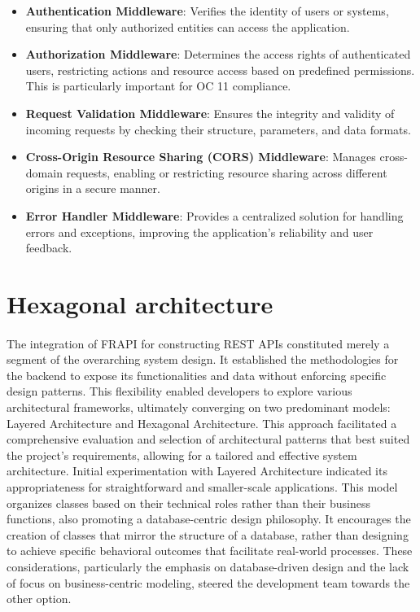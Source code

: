 \begin{itemize}
    \item \textbf{Authentication Middleware}: Verifies the identity of users or systems, ensuring that only authorized entities can access the application.
    \item \textbf{Authorization Middleware}: Determines the access rights of authenticated users, restricting actions and resource access based on predefined permissions. This is particularly important for OC 11 compliance.
    \item \textbf{Request Validation Middleware}: Ensures the integrity and validity of incoming requests by checking their structure, parameters, and data formats.
    \item \textbf{Cross-Origin Resource Sharing (CORS) Middleware}: Manages cross-domain requests, enabling or restricting resource sharing across different origins in a secure manner.
    \item \textbf{Error Handler Middleware}: Provides a centralized solution for handling errors and exceptions, improving the application's reliability and user feedback.
\end{itemize}

\section{Hexagonal architecture}
\paragraph{} The integration of FRAPI for constructing REST APIs constituted merely a segment of the overarching system design. It established the methodologies for the backend to expose its functionalities and data without enforcing specific design patterns. This flexibility enabled developers to explore various architectural frameworks, ultimately converging on two predominant models: Layered Architecture and Hexagonal Architecture. This approach facilitated a comprehensive evaluation and selection of architectural patterns that best suited the project's requirements, allowing for a tailored and effective system architecture. Initial experimentation with Layered Architecture indicated its appropriateness for straightforward and smaller-scale applications. This model organizes classes based on their technical roles rather than their business functions, also promoting a database-centric design philosophy. It encourages the creation of classes that mirror the structure of a database, rather than designing to achieve specific behavioral outcomes that facilitate real-world processes. These considerations, particularly the emphasis on database-driven design and the lack of focus on business-centric modeling, steered the development team towards the other option.

